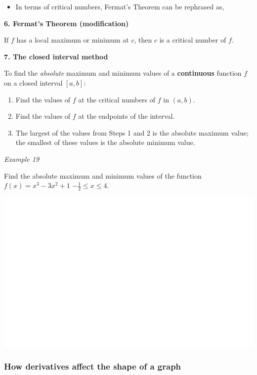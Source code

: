 \documentclass[]{book}
\providecommand{\tightlist}{%
  \setlength{\itemsep}{0pt}\setlength{\parskip}{0pt}}
\begin{document}
\begin{itemize}
\tightlist
\item
  In terms of critical numbers, Fermat's Theorem can be rephrased as,
\end{itemize}

\textbf{6. Fermat's Theorem (modification)}

If \(f\) has a local maximum or minimum at \(c\), then \(c\) is a critical number of \(f\).

\textbf{7. The closed interval method}

To find the \emph{absolute} maximum and minimum values of a \textbf{continuous} function \(f\) on a closed interval \([a,b]\):

\begin{enumerate}
\def\labelenumi{\arabic{enumi}.}
\item
  Find the values of \(f\) at the critical numbers of \(f\) in \((a,b)\).
\item
  Find the values of \(f\) at the endpoints of the interval.
\item
  The largest of the values from Steps 1 and 2 is the absolute maximum value; the smallest of these values is the absolute minimum value.
\end{enumerate}

\emph{Example 19}

Find the absolute maximum and minimum values of the function \(f(x)=x^3-3x^2+1\) \(-\frac{1}{2} \leq x \leq4.\)

\begin{center}\includegraphics[width=1\linewidth]{figure/LB34-1} \end{center}

\newpage

\hypertarget{how-derivatives-affect-the-shape-of-a-graph}{%
\subsubsection{How derivatives affect the shape of a graph}\label{how-derivatives-affect-the-shape-of-a-graph}}
\end{document}
